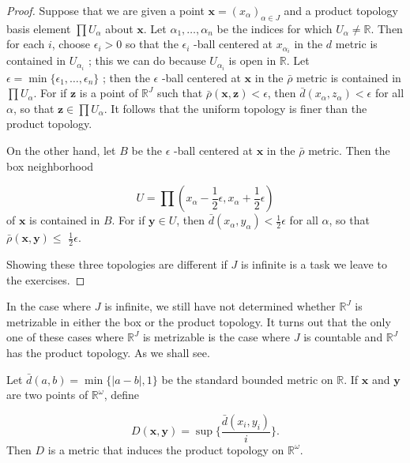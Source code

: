 \begin{proof}
 Suppose that we are given a point \(\mathbf{x} = {( x_{\alpha }) }_{\alpha \in J}\) and a product topology basis element \(\prod {U}_{\alpha }\) about \(\mathbf{x}\). Let \({\alpha }_{1},\ldots,{\alpha }_{n}\) be the indices for which \(U_{\alpha } \neq \mathbb{R}\). Then for each \(i\), choose \({\epsilon }_{i} > 0\) so that the \({\epsilon }_{i}\) -ball centered at \(x_{{\alpha }_{i}}\) in the \(d\) metric is contained in \(U_{{\alpha }_{i}}\) ; this we can do because \(U_{{\alpha }_{i}}\) is open in \(\mathbb{R}\). Let \(\epsilon = \min \{ {{\epsilon }_{1},\ldots,{\epsilon }_{n}}\}\) ; then the \(\epsilon\) -ball centered at \(\mathbf{x}\) in the \(\bar{\rho }\) metric is contained in \(\prod {U}_{\alpha }\). For if \(\mathbf{z}\) is a point of \(\mathbb{R}^{J}\) such that \(\bar{\rho }( {\mathbf{x},\mathbf{z}}) < \epsilon\), then \(\bar{d}( {x_{\alpha },z_{\alpha }}) < \epsilon\) for all \(\alpha\), so that \(\mathbf{z} \in \prod {U}_{\alpha }\). It follows that the uniform topology is finer than the product topology.

 On the other hand, let \(B\) be the \(\epsilon\) -ball centered at \(\mathbf{x}\) in the \(\bar{\rho }\) metric. Then the box neighborhood

 \[
 U = \prod ( {x_{\alpha } - \frac{1}{2}\epsilon,x_{\alpha } + \frac{1}{2}\epsilon })
 \]
 of \(\mathbf{x}\) is contained in \(B\). For if \(\mathbf{y} \in U\), then \(\bar{d}( {x_{\alpha },y_{\alpha }}) < \frac{1}{2}\epsilon\) for all \(\alpha\), so that \(\bar{\rho }( {\mathbf{x},\mathbf{y}}) \leq\) \(\frac{1}{2}\epsilon\).

 Showing these three topologies are different if \(J\) is infinite is a task we leave to the exercises.
\end{proof}

In the case where \(J\) is infinite, we still have not determined whether \(\mathbb{R}^{J}\) is metrizable in either the box or the product topology. It turns out that the only one of these cases where \(\mathbb{R}^{J}\) is metrizable is the case where \(J\) is countable and \(\mathbb{R}^{J}\) has the product topology. As we shall see.

\begin{theorem}
\label{thm:\thetheorem}
 Let \(\bar{d}( {a,b}) = \min \{ | {a - b}|,1\}\) be the standard bounded metric on \(\mathbb{R}\). If \(\mathbf{x}\) and \(\mathbf{y}\) are two points of \(\mathbb{R}^{\omega }\), define

 \[
 D( {\mathbf{x},\mathbf{y}}) = \sup \{ \frac{\bar{d}( {x_{i},y_{i}}) }{i}\}.
 \]
 Then \(D\) is a metric that induces the product topology on \(\mathbb{R}^{\omega }\).
\end{theorem}

